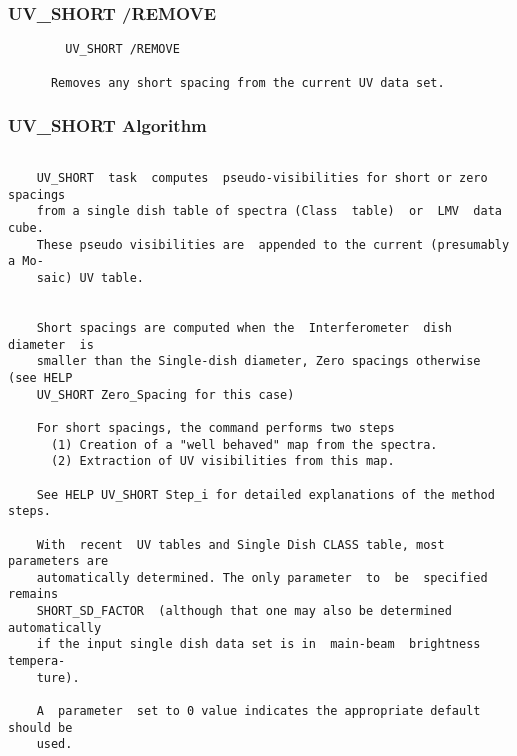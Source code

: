 \subsubsection{UV\_SHORT /REMOVE}
\begin{verbatim}
        UV_SHORT /REMOVE

      Removes any short spacing from the current UV data set.

\end{verbatim}
\subsubsection{UV\_SHORT Algorithm}
\begin{verbatim}

    UV_SHORT  task  computes  pseudo-visibilities for short or zero spacings
    from a single dish table of spectra (Class  table)  or  LMV  data  cube.
    These pseudo visibilities are  appended to the current (presumably a Mo-
    saic) UV table.


    Short spacings are computed when the  Interferometer  dish  diameter  is
    smaller than the Single-dish diameter, Zero spacings otherwise (see HELP
    UV_SHORT Zero_Spacing for this case)

    For short spacings, the command performs two steps
      (1) Creation of a "well behaved" map from the spectra.
      (2) Extraction of UV visibilities from this map.

    See HELP UV_SHORT Step_i for detailed explanations of the method  steps.

    With  recent  UV tables and Single Dish CLASS table, most parameters are
    automatically determined. The only parameter  to  be  specified  remains
    SHORT_SD_FACTOR  (although that one may also be determined automatically
    if the input single dish data set is in  main-beam  brightness  tempera-
    ture).

    A  parameter  set to 0 value indicates the appropriate default should be
    used.

\end{verbatim}
